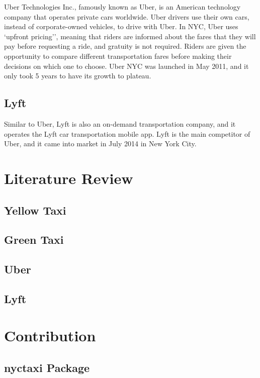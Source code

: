 \documentclass[12pt,twoside]{reedthesis}
\theoremstyle{definition}
\theoremstyle{definition}
\theoremstyle{definition}
\theoremstyle{remark}
\begin{document}
Uber Technologies Inc., famously known as Uber, is an American
technology company that operates private cars worldwide. Uber drivers
use their own cars, instead of corporate-owned vehicles, to drive with
Uber. In NYC, Uber uses `upfront pricing'', meaning that riders are
informed about the fares that they will pay before requesting a ride,
and gratuity is not required. Riders are given the opportunity to
compare different transportation fares before making their decisions on
which one to choose. Uber NYC was launched in May 2011, and it only took
5 years to have its growth to plateau.

\subsection{Lyft}\label{lyft}

Similar to Uber, Lyft is also an on-demand transportation company, and
it operates the Lyft car transportation mobile app. Lyft is the main
competitor of Uber, and it came into market in July 2014 in New York
City.

\section{Literature Review}\label{literature-review}

\subsection{Yellow Taxi}\label{yellow-taxi-1}

\subsection{Green Taxi}\label{green-taxi-1}

\subsection{Uber}\label{uber-1}

\subsection{Lyft}\label{lyft-1}

\section{Contribution}\label{contribution}

\subsection{nyctaxi Package}\label{nyctaxi-package}
\end{document}
